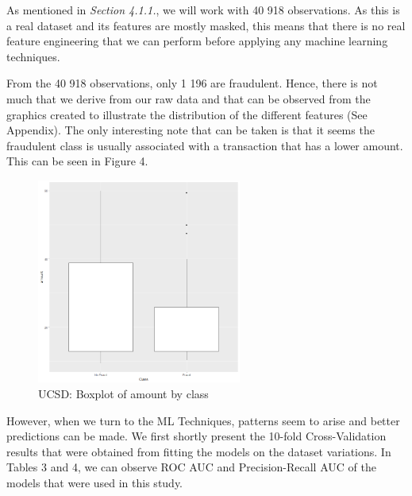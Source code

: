 \documentclass[12pt,]{article}
\begin{document}
As mentioned in \emph{Section 4.1.1.}, we will work with 40 918
observations. As this is a real dataset and its features are mostly
masked, this means that there is no real feature engineering that we can
perform before applying any machine learning techniques.

From the 40 918 observations, only 1 196 are fraudulent. Hence, there is
not much that we derive from our raw data and that can be observed from
the graphics created to illustrate the distribution of the different
features (See Appendix). The only interesting note that can be taken is
that it seems the fraudulent class is usually associated with a
transaction that has a lower amount. This can be seen in Figure 4.

\begin{figure}
\centering
\includegraphics[width=0.6\textwidth,height=\textheight]{figures/ucsd/descriptive/boxplot_amount.png}
\caption{UCSD: Boxplot of amount by class}
\end{figure}

However, when we turn to the ML Techniques, patterns seem to arise and
better predictions can be made. We first shortly present the 10-fold
Cross-Validation results that were obtained from fitting the models on
the dataset variations. In Tables 3 and 4, we can observe ROC AUC and
Precision-Recall AUC of the models that were used in this study.
\end{document}
